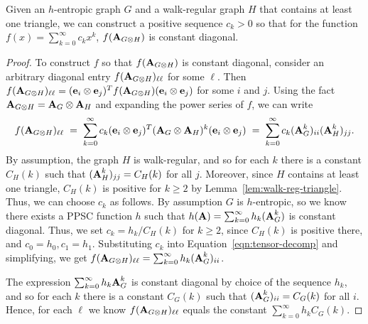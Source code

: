 \begin{lemma}\label{lem:tensor-constant-diagonal-lemma}
  Given an $h$-entropic graph $G$ and a walk-regular graph $H$ that contains at least one triangle, we can construct a positive sequence $c_k > 0$ so that for the function $f(x) = \sum_{k=0}^{\infty} c_k x^k$,
   $f(\textbf{A}_{G \otimes H})$ is constant diagonal.
\end{lemma}
\begin{proof}
    To construct $f$ so that $f(\textbf{A}_{G \otimes H})$ is constant diagonal, consider an arbitrary diagonal entry $f( \textbf{A}_{G \otimes H})_{\ell \ell}$ for some $\ell$.
    Then $f(\textbf{A}_{G \otimes H})_{\ell \ell} =
    (\textbf{e}_i\otimes\textbf{e}_j)^Tf(\textbf{A}_{G\otimes H})(\textbf{e}_i\otimes\textbf{e}_j)$ for some $i$ and $j$.
    Using the fact $\textbf{A}_{G \otimes H} = \textbf{A}_{G} \otimes \textbf{A}_H$ and expanding the power series of $f$, we can write
    \begin{equation}
        f(\textbf{A}_{G \otimes H})_{\ell \ell}
        \hspace{3pt} = \hspace{3pt}
        \sum_{k=0}^{\infty} c_k  (\textbf{e}_i \otimes \textbf{e}_j)^T (\textbf{A}_{G} \otimes \textbf{A}_H)^k (\textbf{e}_i \otimes \textbf{e}_j)
        \hspace{3pt} = \hspace{3pt}
        \sum_{k=0}^{\infty} c_k (\textbf{A}_{G}^k)_{ii} (\textbf{A}_H^k)_{jj}. \label{eqn:tensor-decomp}
    \end{equation}
    By assumption, the graph $H$ is walk-regular, and so for each $k$ there is a constant $C_H(k)$ such that $(\textbf{A}_H^k)_{jj} = C_H(k)$ for all $j$.
    Moreover, since $H$ contains at least one triangle, $C_H(k)$ is positive for $k \geq 2$ by Lemma~\ref{lem:walk-reg-triangle}.
    Thus, we can choose $c_k$ as follows.
    By assumption $G$ is $h$-entropic, so we know there exists a PPSC function $h$ such that $h(\textbf{A}) = \sum_{k=0}^{\infty} h_k (\textbf{A}_G^k)$ is constant diagonal.
    Thus, we set $c_k = h_k / C_H(k)$ for $k\geq 2$, since $C_H(k)$ is positive there, and $c_0 = h_0, c_1 = h_1$.
    Substituting $c_k$ into Equation~\eqref{eqn:tensor-decomp} and simplifying, we get
    $f(\textbf{A}_{G\otimes H})_{\ell \ell} = \sum_{k=0}^{\infty} h_k (\textbf{A}_{G}^k)_{ii}$.

    The expression $\sum_{k=0}^{\infty}h_k \textbf{A}_G^k$ is constant diagonal by choice of the sequence $h_k$, and so for each $k$ there is a constant $C_G(k)$ such that $(\textbf{A}_{G}^k)_{ii} = C_G(k)$ for all $i$.
    Hence, for each $\ell$ we know $f(\textbf{A}_{G\otimes H})_{\ell \ell}$ equals the constant $\sum_{k=0}^{\infty} h_k C_G(k)$.
\end{proof}
